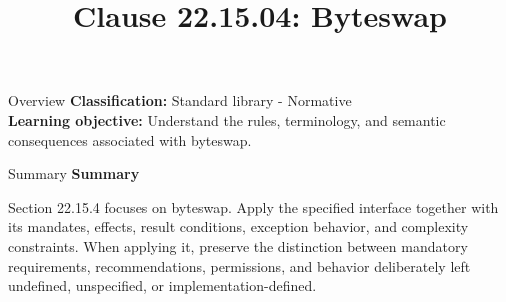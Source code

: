 \documentclass[10pt,letterpaper]{article}
\title{Clause 22.15.04: Byteswap}
\author{}
\date{}
\begin{document}
\maketitle
\begin{CornellOverviewBox}{Overview}
\textbf{Classification:} Standard library - Normative\\[2pt]
\textbf{Learning objective:} Understand the rules, terminology, and semantic consequences associated with byteswap.
\end{CornellOverviewBox}\begin{CornellSummaryBox}{Summary}
{\sffamily\bfseries\color{Accent} Summary}\par\vspace{3pt}Section 22.15.4 focuses on byteswap. Apply the specified interface together with its mandates, effects, result conditions, exception behavior, and complexity constraints. When applying it, preserve the distinction between mandatory requirements, recommendations, permissions, and behavior deliberately left undefined, unspecified, or implementation-defined.
\end{CornellSummaryBox}
\end{document}
